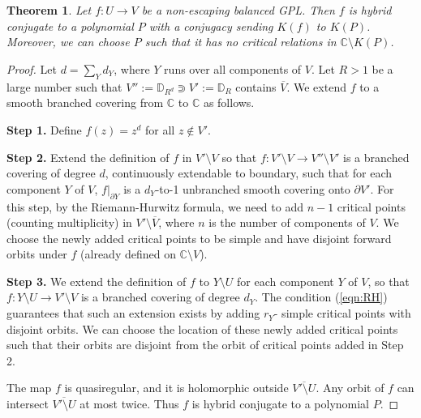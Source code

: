 \documentclass{amsart}
\numberwithin{equation}{section}
\newtheorem{theorem}{Theorem}[section]
\newcommand{\C}{\mathbb C}
\theoremstyle{definition}
\theoremstyle{remark}
\begin{document}
\begin{theorem}\label{thm:straighten}
Let $f:U\to V$ be a non-escaping balanced GPL. Then $f$ is hybrid conjugate to a polynomial $P$ with a conjugacy sending $K(f)$ to $K(P)$. Moreover, we can choose $P$ such that it has no critical relations in $\mathbb{C}\setminus K(P)$.
\end{theorem}
\begin{proof} Let $d=\sum_{Y} d_Y$, where $Y$ runs over all components of $V$. 
Let $R>1$ be a large number such that $V'':=\mathbb{D}_{R^d}\Supset V':=\mathbb{D}_{R}$ contains $\overline{V}$. 
We extend $f$ to a smooth branched covering from $\mathbb{C}$ to $\mathbb{C}$ as follows. 

{\bf Step 1.} Define $f(z)=z^d$ for all $z\not\in V'$. 

{\bf Step 2.} Extend the definition of $f$ in $V'\setminus V$ so that $f: V'\setminus V\to V''\setminus V'$ is a branched covering of degree $d$, continuously extendable to boundary, such that for each component $Y$ of $V$, $f|_{\partial Y}$ is a $d_Y$-to-1 unbranched smooth covering onto $\partial V'$. For this step, by the Riemann-Hurwitz formula, we need to add $n-1$ critical points (counting multiplicity) in $V'\setminus \overline{V}$, where $n$ is the number of components of $V$. We choose the newly added critical points to be simple and have disjoint forward orbits under $f$ (already defined on $\C\setminus V$). 

{\bf Step 3.} We extend the definition of $f$ to $Y\setminus U$ for each component $Y$ of $V$, so that $f:Y\setminus U\to V'\setminus V$ is a branched covering of degree $d_Y$. The condition (\ref{eqn:RH}) guarantees that such an extension exists by adding $r_Y$- simple critical points with disjoint orbits. We can choose the location of these newly added critical points such that their orbits are disjoint from the orbit of critical points added in Step 2. 

The map $f$ is quasiregular, and it is holomorphic outside $\overline{V'\setminus U}$. Any orbit of $f$ can intersect $\overline{V'\setminus U}$ at most twice. Thus $f$ is hybrid conjugate to a polynomial $P$.


\end{proof}
\end{document}
